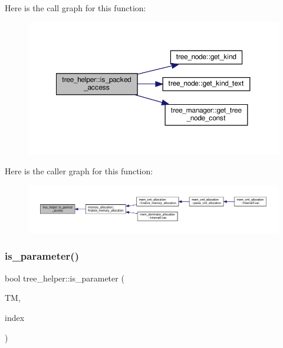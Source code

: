 Here is the call graph for this function\+:
\nopagebreak
\begin{figure}[H]
\begin{center}
\leavevmode
\includegraphics[width=350pt]{d7/d99/classtree__helper_ae706d20dd7fa5cc5d33649877084622b_cgraph}
\end{center}
\end{figure}
Here is the caller graph for this function\+:
\nopagebreak
\begin{figure}[H]
\begin{center}
\leavevmode
\includegraphics[width=350pt]{d7/d99/classtree__helper_ae706d20dd7fa5cc5d33649877084622b_icgraph}
\end{center}
\end{figure}
\mbox{\label{classtree__helper_a710ad60447604c98f49d4d49359071a1}} 
\subsubsection{\texorpdfstring{is\+\_\+parameter()}{is\_parameter()}}
{\footnotesize\ttfamily bool tree\+\_\+helper\+::is\+\_\+parameter (\begin{DoxyParamCaption}\item[{const \hyperlink{tree__manager_8hpp_a792e3f1f892d7d997a8d8a4a12e39346}{tree\+\_\+manager\+Const\+Ref} \&}]{TM,  }\item[{const unsigned int}]{index }\end{DoxyParamCaption})\hspace{0.3cm}{\ttfamily [static]}}



